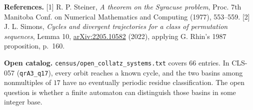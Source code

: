 \documentclass[11pt]{article}
\begin{document}
\vspace{4pt}
{\small
\textbf{References.} [1] R. P. Steiner, \emph{A theorem on the Syracuse
problem}, Proc. 7th Manitoba Conf. on Numerical Mathematics and Computing
(1977), 553--559. [2] J. L. Simons, \emph{Cycles and divergent trajectories
for a class of permutation sequences}, Lemma 10,
\href{https://arxiv.org/abs/2205.10582}{arXiv:2205.10582} (2022), applying
G. Rhin's 1987 proposition, p.~160.\par}

\vspace{4pt}
{\small
\textbf{Open catalog.} \texttt{census/}\allowbreak\texttt{open\_collatz\_systems.txt}
covers 66 entries. In CLS-057 (\texttt{qrA3\_q17}), every orbit
reaches a known cycle, and the two basins among nonmultiples of \(17\)
have no eventually periodic residue classification. The open question is
whether a finite automaton can distinguish those basins in some integer base.\par}
\end{document}

